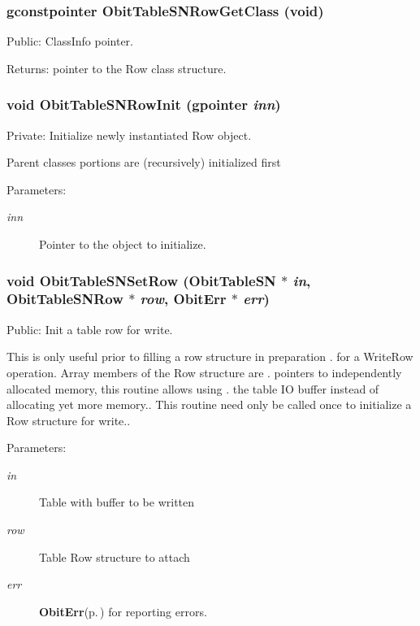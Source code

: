 \subsubsection{\setlength{\rightskip}{0pt plus 5cm}gconstpointer Obit\-Table\-SNRow\-Get\-Class (void)}\label{ObitTableSN_8c_a15}


Public: Class\-Info pointer. 

\begin{Desc}
\item[Returns:]pointer to the Row class structure. \end{Desc}
\subsubsection{\setlength{\rightskip}{0pt plus 5cm}void Obit\-Table\-SNRow\-Init (gpointer {\em inn})}\label{ObitTableSN_8c_a6}


Private: Initialize newly instantiated Row object. 

Parent classes portions are (recursively) initialized first \begin{Desc}
\item[Parameters:]
\begin{description}
\item[{\em inn}]Pointer to the object to initialize. \end{description}
\end{Desc}
\subsubsection{\setlength{\rightskip}{0pt plus 5cm}void Obit\-Table\-SNSet\-Row ({\bf Obit\-Table\-SN} $\ast$ {\em in}, {\bf Obit\-Table\-SNRow} $\ast$ {\em row}, {\bf Obit\-Err} $\ast$ {\em err})}\label{ObitTableSN_8c_a23}


Public: Init a table row for write. 

This is only useful prior to filling a row structure in preparation . for a Write\-Row operation. Array members of the Row structure are . pointers to independently allocated memory, this routine allows using . the table IO buffer instead of allocating yet more memory.. This routine need only be called once to initialize a Row structure for write.. \begin{Desc}
\item[Parameters:]
\begin{description}
\item[{\em in}]Table with buffer to be written \item[{\em row}]Table Row structure to attach \item[{\em err}]{\bf Obit\-Err}{\rm (p.\,\pageref{structObitErr})} for reporting errors. \end{description}
\end{Desc}
